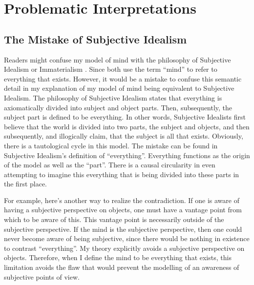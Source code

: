 \chapter{Problematic Interpretations}
\label{chapter:problematic_interpretations}

\section{The Mistake of Subjective Idealism}
\label{section:the_mistake_of_subjective_idealism}

Readers might confuse my model of mind with the philosophy of
Subjective Idealism or Immaterialism \citep{berkeley:1734}.  Since
both use the term ``mind'' to refer to everything that exists.
However, it would be a mistake to confuse this semantic detail in my
explanation of my model of mind being equivalent to Subjective
Idealism.  The philosophy of Subjective Idealism states that
everything is axiomatically divided into subject and object parts.
Then, subsequently, the subject part is defined to be everything.  In
other words, Subjective Idealists first believe that the world is
divided into two parts, the subject and objects, and then
subsequently, and illogically claim, that the subject is all that
exists.  Obviously, there is a tautological cycle in this model.  The
mistake can be found in Subjective Idealism's definition of
``everything''.  Everything functions as the origin of the model as
well as the ``part''.  There is a causal circularity in even
attempting to imagine this everything that is being divided into these
parts in the first place.

For example, here's another way to realize the contradiction.  If one
is aware of having a subjective perspective on objects, one must have
a vantage point from which to be aware of this.  This vantage point is
necessarily outside of the subjective perspective.  If the mind is the
subjective perspective, then one could never become aware of being
subjective, since there would be nothing in existence to contrast
``everything''.  My theory explicitly avoids a subjective perspective
on objects.  Therefore, when I define the mind to be everything that
exists, this limitation avoids the flaw that would prevent the
modelling of an awareness of subjective points of view.

